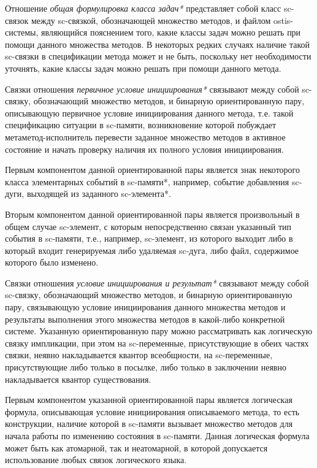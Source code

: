 Отношение \textit{общая формулировка класса задач*} представляет собой класс sc-связок между sc-связкой, обозначающей множество методов, и файлом ostis-системы, являющийся пояснением того, какие классы задач можно решать при помощи данного множества методов. В некоторых редких случаях наличие такой sc-связки в спецификации метода может и не быть, поскольку нет необходимости уточнять, какие классы задач можно решать при помощи данного метода.

Связки отношения \textit{первичное условие инициирования*} связывают между собой sc-связку, обозначающий множество методов, и бинарную ориентированную пару, описывающую первичное условие инициирования данного метода, т.е. такой спецификацию ситуации в sc-памяти, возникновение которой побуждает метаметод-исполнитель перевести заданное множество методов в активное состояние и начать проверку наличия их полного условия инициирования.

Первым компонентом данной ориентированной пары является знак некоторого класса элементарных событий в sc-памяти*, например, событие добавления sc-дуги, выходящей из заданного sc-элемента*.

Вторым компонентом данной ориентированной пары является произвольный в общем случае sc-элемент, с которым непосредственно связан указанный тип события в sc-памяти, т.е., например, sc-элемент, из которого выходит либо в который входит генерируемая либо удаляемая sc-дуга, либо файл, содержимое которого было изменено.

Связки отношения \textit{условие инициирования и результат*} связывают между собой sc-связку, обозначающий множество методов, и бинарную ориентированную пару, связывающую условие инициирования данного множества методов и результаты выполнения этого множества методов в какой-либо конкретной системе. Указанную ориентированную пару можно рассматривать как логическую связку импликации, при этом на sc-переменные, присутствующие в обеих частях связки, неявно накладывается квантор всеобщности, на
sc-переменные, присутствующие либо только в посылке, либо только в заключении неявно накладывается
квантор существования.

Первым компонентом указанной ориентированной пары является логическая формула, описывающая условие инициирования описываемого метода, то есть конструкции, наличие которой в sc-памяти вызывает множество методов для начала работы по изменению состояния в sc-памяти. Данная логическая формула может быть как атомарной, так и неатомарной, в которой допускается использование любых связок логического языка.

